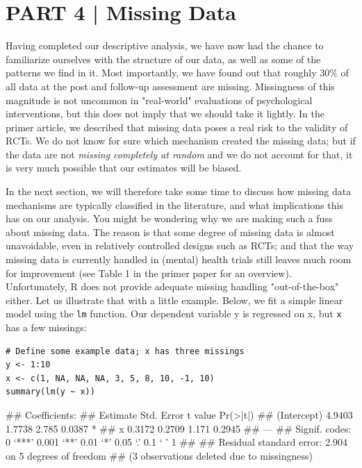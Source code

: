 \section{{\textsf{\textcolor{sBlue}{\small PART 4 |}}} Missing Data}

Having completed our descriptive analysis, we have now had the chance to familiarize ourselves with the structure of our data, as well as some of the patterns we find in it. Most importantly, we have found out that roughly 30\% of all data at the post and follow-up assessment are missing. Missingness of this magnitude is not uncommon in "real-world" evaluations of psychological interventions, but this does not imply that we should take it lightly. In the primer article, we described that missing data poses a real risk to the validity of RCTs. We do not know for sure which mechanism created the missing data; but if the data are not \emph{missing completely at random} and we do not account for that, it is very much possible that our estimates will be biased.

In the next section, we will therefore take some time to discuss how missing data mechanisms are typically classified in the literature, and what implications this has on our analysis. You might be wondering why we are making such a fuss about missing data. The reason is that some degree of missing data is almost unavoidable, even in relatively controlled designs such as RCTs; and that the way missing data is currently handled in (mental) health trials still leaves much room for improvement (see Table 1 in the primer paper for an overview). Unfortunately, \textsf{R} does not provide adequate missing handling "out-of-the-box" either. Let us illustrate that with a little example. Below, we fit a simple linear model using the \texttt{lm} function. Our dependent variable \textsf{y} is regressed on \textsf{x}, but \texttt{x} has a few missings:

\begin{lstlisting}
# Define some example data; x has three missings
y <- 1:10
x <- c(1, NA, NA, NA, 3, 5, 8, 10, -1, 10)
summary(lm(y ~ x))
\end{lstlisting}

\begin{example}
## Coefficients:
## Estimate Std. Error t value Pr(>|t|)
## (Intercept) 4.9403 1.7738 2.785 0.0387 *
## x 0.3172 0.2709 1.171 0.2945
## ---
## Signif. codes: 0 ‘***’ 0.001 ‘**’ 0.01 ‘*’ 0.05 ‘.’ 0.1 ‘ ’ 1
##
## Residual standard error: 2.904 on 5 degrees of freedom
## (3 observations deleted due to missingness)
\end{example}

